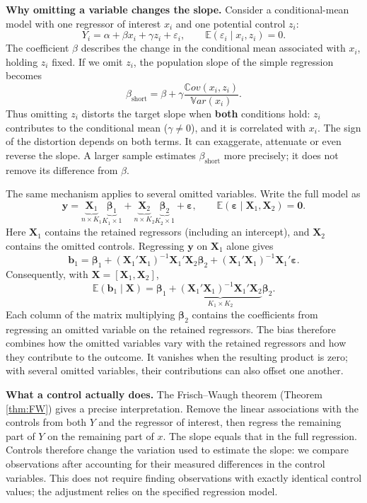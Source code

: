 \documentclass[
  11pt,
]{book}
\theoremstyle{definition}
\theoremstyle{definition}
\theoremstyle{definition}
\theoremstyle{definition}
\theoremstyle{remark}
\begin{document}
\textbf{Why omitting a variable changes the slope.} Consider a conditional-mean model with one regressor of interest \(x_i\) and one potential control \(z_i\):
\[
Y_i=\alpha+\beta x_i+\gamma z_i+\varepsilon_i,
\qquad \mathbb{E}(\varepsilon_i\mid x_i,z_i)=0.
\]
The coefficient \(\beta\) describes the change in the conditional mean associated with \(x_i\), holding \(z_i\) fixed. If we omit \(z_i\), the population slope of the simple regression becomes
\begin{equation}
\beta_{\mathrm{short}}=\beta+\gamma
\frac{\mathbb{C}ov(x_i,z_i)}{\mathbb{V}ar(x_i)}.\label{eq:omitted-scalar}
\end{equation}
Thus omitting \(z_i\) distorts the target slope when \textbf{both} conditions hold: \(z_i\) contributes to the conditional mean (\(\gamma\ne0\)), and it is correlated with \(x_i\). The sign of the distortion depends on both terms. It can exaggerate, attenuate or even reverse the slope. A larger sample estimates \(\beta_{\mathrm{short}}\) more precisely; it does not remove its difference from \(\beta\).

The same mechanism applies to several omitted variables. Write the full model as
\[
\mathbf{y} = \underbrace{\mathbf{X}_1}_{n \times K_1}\underbrace{\boldsymbol\beta_1}_{K_1 \times 1} + \underbrace{\mathbf{X}_2}_{n\times K_2}\underbrace{\boldsymbol\beta_2}_{K_2 \times 1} + \boldsymbol\varepsilon,
\qquad \mathbb{E}(\boldsymbol\varepsilon\mid\mathbf{X}_1,\mathbf{X}_2)=\mathbf{0}.
\]
Here \(\mathbf{X}_1\) contains the retained regressors (including an intercept), and \(\mathbf{X}_2\) contains the omitted controls. Regressing \(\mathbf{y}\) on \(\mathbf{X}_1\) alone gives
\[
\mathbf{b}_1 = \boldsymbol\beta_1 + (\mathbf{X}_1'\mathbf{X}_1)^{-1}\mathbf{X}_1'\mathbf{X}_2\boldsymbol\beta_2 +
(\mathbf{X}_1'\mathbf{X}_1)^{-1}\mathbf{X}_1'\boldsymbol\varepsilon.
\]
Consequently, with \(\mathbf{X}=[\mathbf{X}_1,\mathbf{X}_2]\),
\[
\mathbb{E}(\mathbf{b}_1\mid\mathbf{X}) = \boldsymbol\beta_1 + \underbrace{(\mathbf{X}_1'\mathbf{X}_1)^{-1}\mathbf{X}_1'\mathbf{X}_2}_{K_1 \times K_2}\boldsymbol\beta_2.
\]
Each column of the matrix multiplying \(\boldsymbol\beta_2\) contains the coefficients from regressing an omitted variable on the retained regressors. The bias therefore combines how the omitted variables vary with the retained regressors and how they contribute to the outcome. It vanishes when the resulting product is zero; with several omitted variables, their contributions can also offset one another.

\textbf{What a control actually does.} The Frisch--Waugh theorem (Theorem \ref{thm:FW}) gives a precise interpretation. Remove the linear associations with the controls from both \(Y\) and the regressor of interest, then regress the remaining part of \(Y\) on the remaining part of \(x\). The slope equals that in the full regression. Controls therefore change the variation used to estimate the slope: we compare observations after accounting for their measured differences in the control variables. This does not require finding observations with exactly identical control values; the adjustment relies on the specified regression model.
\end{document}
